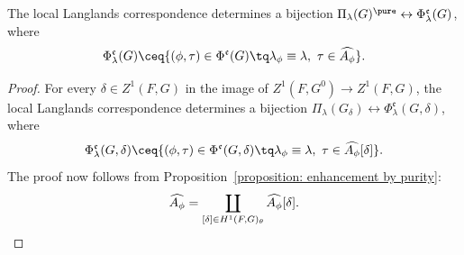 \documentclass[11pt,letterpaper]{amsart}
\numberwithin{equation}{section}
\begin{document}
\begin{lemma}
The local Langlands correspondence determines a bijection 
$
\Pi_\lambda(G)^\pure 
\leftrightarrow \Phi_\lambda^\mathfrak{e}(G)$, where 
\[
\Phi_\lambda^\mathfrak{e}(G) \ceq \{ (\phi,\tau) \in \Phi^\mathfrak{e}(G) \tq \lambda_\phi \equiv \lambda,\ \tau\in \widehat{A_\phi}\}.
\]
\end{lemma}

\begin{proof}
    For every $\delta \in Z^1(F,G)$ in the image of $Z^1(F,G^0)\to Z^1(F,G)$,
    the local Langlands correspondence determines a bijection 
    $
\Pi_\lambda(G_\delta) 
\leftrightarrow \Phi^\mathfrak{e}_\lambda(G, \delta)$, where 
\[
\Phi^\mathfrak{e}_\lambda(G,\delta) \ceq \{ (\phi,\tau) \in \Phi^\mathfrak{e}(G,\delta) \tq \lambda_\phi \equiv \lambda,\ \tau\in \widehat{A_\phi}[\delta]\}.
\]
The proof now follows from Proposition~\ref{proposition: enhancement by purity}: 
\[
\widehat{A_\phi} = \coprod_{[\delta]\in H^1(F,G)_{\theta}} \widehat{A_\phi}[\delta]. \qedhere
\] 
\end{proof}
\end{document}
